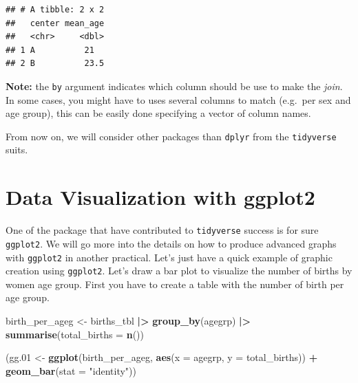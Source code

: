 \documentclass[
]{book}
\newenvironment{Shaded}{\begin{snugshade}}{\end{snugshade}}
\newcommand{\AttributeTok}[1]{\textcolor[rgb]{0.13,0.29,0.53}{#1}}
\newcommand{\FloatTok}[1]{\textcolor[rgb]{0.00,0.00,0.81}{#1}}
\newcommand{\FunctionTok}[1]{\textcolor[rgb]{0.13,0.29,0.53}{\textbf{#1}}}
\newcommand{\NormalTok}[1]{#1}
\newcommand{\OtherTok}[1]{\textcolor[rgb]{0.56,0.35,0.01}{#1}}
\newcommand{\SpecialCharTok}[1]{\textcolor[rgb]{0.81,0.36,0.00}{\textbf{#1}}}
\newcommand{\StringTok}[1]{\textcolor[rgb]{0.31,0.60,0.02}{#1}}
\begin{document}
\begin{verbatim}
## # A tibble: 2 x 2
##   center mean_age
##   <chr>     <dbl>
## 1 A          21  
## 2 B          23.5
\end{verbatim}

\textbf{Note:} the \texttt{by} argument indicates which column should be use to make the \emph{join}. In some
cases, you might have to uses several columns to match (e.g.~per sex and age group), this
can be easily done specifying a vector of column names.

From now on, we will consider other packages than \texttt{dplyr} from the \texttt{tidyverse} suits.

\section{Data Visualization with ggplot2}\label{data-visualization-with-ggplot2}

One of the package that have contributed to \texttt{tidyverse} success is for sure \texttt{ggplot2}.
We will go more into the details on how to produce advanced graphs with \texttt{ggplot2} in another practical.
Let's just have a quick example of graphic creation using \texttt{ggplot2}.
Let's draw a bar plot to visualize the number of births by women age group.
First you have to create a table with the number of birth per age group.

\begin{Shaded}
\begin{Highlighting}[]
\NormalTok{birth\_per\_ageg }\OtherTok{\textless{}{-}}\NormalTok{ births\_tbl }\SpecialCharTok{|\textgreater{}}
  \FunctionTok{group\_by}\NormalTok{(agegrp) }\SpecialCharTok{|\textgreater{}}
  \FunctionTok{summarise}\NormalTok{(}\AttributeTok{total\_births =} \FunctionTok{n}\NormalTok{())}
\end{Highlighting}
\end{Shaded}

\begin{Shaded}
\begin{Highlighting}[]
\NormalTok{(gg}\FloatTok{.01} \OtherTok{\textless{}{-}}
  \FunctionTok{ggplot}\NormalTok{(birth\_per\_ageg, }\FunctionTok{aes}\NormalTok{(}\AttributeTok{x =}\NormalTok{ agegrp, }\AttributeTok{y =}\NormalTok{ total\_births)) }\SpecialCharTok{+}
  \FunctionTok{geom\_bar}\NormalTok{(}\AttributeTok{stat =} \StringTok{"identity"}\NormalTok{))}
\end{Highlighting}
\end{Shaded}
\end{document}
